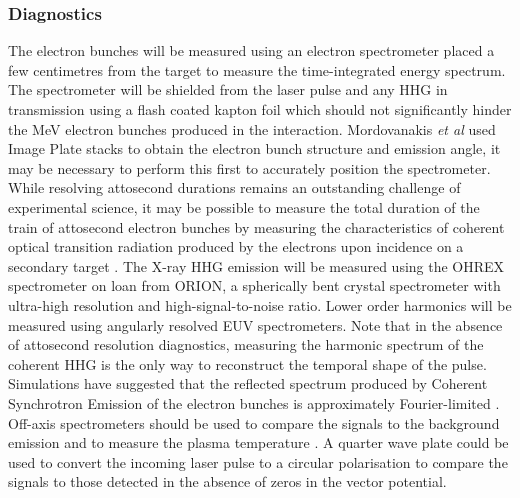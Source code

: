 \subsubsection{Diagnostics}
The electron bunches will be measured using an electron spectrometer placed a few centimetres from the target to measure the time-integrated energy spectrum. The spectrometer will be shielded from the laser pulse and any \ac{HHG} in transmission using a flash coated kapton foil which should not significantly hinder the MeV electron bunches produced in the interaction. Mordovanakis \textit{et al} used Image Plate stacks to obtain the electron bunch structure and emission angle, it may be necessary to perform this first to accurately position the spectrometer. While resolving attosecond durations remains an outstanding challenge of experimental science, it may be possible to measure the total duration of the train of attosecond electron bunches by measuring the characteristics of coherent optical transition radiation produced by the electrons upon incidence on a secondary target \cite{linIsolatedAttosecondElectron2020}. The X-ray \ac{HHG} emission will be measured using the OHREX spectrometer \cite{beiersdorferLineshapeSpectroscopyVery2016} on loan from ORION, a spherically bent crystal spectrometer with ultra-high resolution and high-signal-to-noise ratio. Lower order harmonics will be measured using angularly resolved EUV spectrometers. Note that in the absence of attosecond resolution diagnostics, measuring the harmonic spectrum of the coherent \ac{HHG} is the only way to reconstruct the temporal shape of the pulse. Simulations have suggested that the reflected spectrum produced by Coherent Synchrotron Emission of the electron bunches is approximately Fourier-limited \cite{cousensElectronTrajectoriesAssociated2020}. Off-axis spectrometers should be used to compare the signals to the background emission and to measure the plasma temperature \cite{akli_2010_DualChannelXray}. A quarter wave plate could be used to convert the incoming laser pulse to a circular polarisation to compare the signals to those detected in the absence of zeros in the vector potential.

